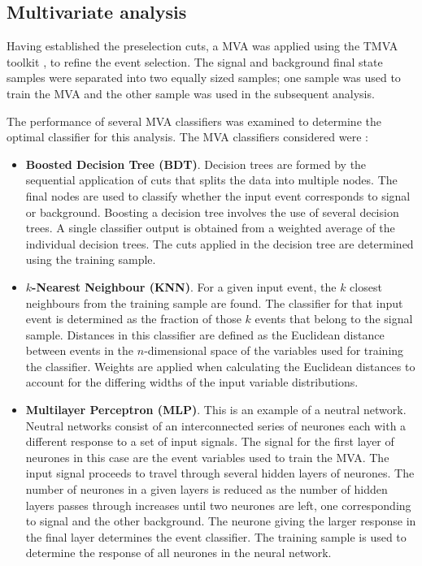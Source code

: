 \subsection{Multivariate analysis}
\label{sec:mva1400GeV}
Having established the preselection cuts, a MVA was applied using the TMVA toolkit \cite{Hocker:2007ht}, to refine the event selection.  The signal and background final state samples were separated into two equally sized samples; one sample was used to train the MVA and the other sample was used in the subsequent analysis.  

The performance of several MVA classifiers was examined to determine the optimal classifier for this analysis.  The MVA classifiers considered were \cite{Hocker:2007ht}:
\begin{itemize}
\item \textbf{Boosted Decision Tree (BDT)}.  Decision trees are formed by the sequential application of cuts that splits the data into multiple nodes.  The final nodes are used to classify whether the input event corresponds to signal or background.  Boosting a decision tree involves the use of several decision trees.  A single classifier output is obtained from a weighted average of the individual decision trees.  The cuts applied in the decision tree are determined using the training sample.  
\item \textbf{$k$-Nearest Neighbour (KNN)}.  For a given input event, the $k$ closest neighbours from the training sample are found.  The classifier for that input event is determined as the fraction of those $k$ events that belong to the signal sample.  Distances in this classifier are defined as the Euclidean distance between events in the $n$-dimensional space of the variables used for training the classifier.  Weights are applied when calculating the Euclidean distances to account for the differing widths of the input variable distributions.  
\item \textbf{Multilayer Perceptron (MLP)}.  This is an example of a neutral network.  Neutral networks consist of an interconnected series of neurones each with a different response to a set of input signals.  The signal for the first layer of neurones in this case are the event variables used to train the MVA.  The input signal proceeds to travel through several hidden layers of neurones.  The number of neurones in a given layers is reduced as the number of hidden layers passes through increases until two neurones are left, one corresponding to signal and the other background.  The neurone giving the larger response in the final layer determines the event classifier.  The training sample is used to determine the response of all neurones in the neural network.

\end{itemize}
